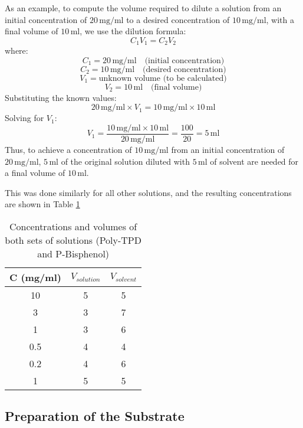 As an example, to compute the volume required to dilute a solution from an initial concentration of \( 20 \, \text{mg/ml} \) to a desired concentration of \( 10 \, \text{mg/ml} \), with a final volume of \( 10 \, \text{ml} \), we use the dilution formula:
\[
C_1 V_1 = C_2 V_2
\]
where:
\[
C_1 = 20 \, \text{mg/ml} \quad \text{(initial concentration)}
\]
\[
C_2 = 10 \, \text{mg/ml} \quad \text{(desired concentration)}
\]
\[
V_1 = \text{unknown volume (to be calculated)}
\]
\[
V_2 = 10 \, \text{ml} \quad \text{(final volume)}
\]
Substituting the known values:
\[
20 \, \text{mg/ml} \times V_1 = 10 \, \text{mg/ml} \times 10 \, \text{ml}
\]
Solving for \( V_1 \):
\[
V_1 = \frac{10 \, \text{mg/ml} \times 10 \, \text{ml}}{20 \, \text{mg/ml}} = \frac{100}{20} = 5 \, \text{ml}
\]
Thus, to achieve a concentration of \( 10 \, \text{mg/ml} \) from an initial concentration of \( 20 \, \text{mg/ml} \), \( 5 \, \text{ml} \) of the original solution diluted with \( 5 \, \text{ml} \) of solvent are needed for a final volume of \( 10 \, \text{ml} \).

This was done similarly for all other solutions, and the resulting concentrations are shown in Table \ref{tab:solution-concentrations}

\begin{table}[]
	\caption{Concentrations and volumes of both sets of solutions (Poly-TPD and P-Bisphenol)}
\label{tab:solution-concentrations}
\begin{center}
\begin{tabular}{@{}ccc@{}}
\toprule
C (mg/ml) & $V_{solution}$ & $V_{solvent}$ \\ \midrule
10                    & 5           & 5          \\ \midrule
3                     & 3           & 7          \\ \midrule
1                     & 3           & 6          \\ \midrule
0.5                   & 4           & 4          \\ \midrule
0.2                   & 4           & 6          \\ \midrule
1                     & 5           & 5          \\ \bottomrule
\end{tabular}
\end{center}
\end{table}

\subsection{Preparation of the Substrate}

